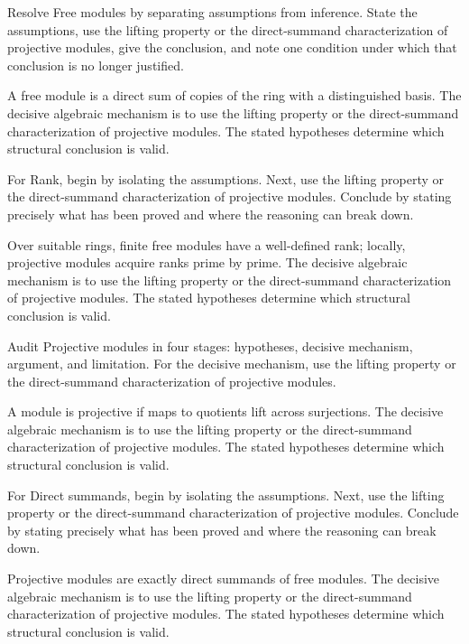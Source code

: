 \begin{problem}\label{prob:v13-problem-01}
Resolve Free modules by separating assumptions from inference. State the assumptions, use the lifting property or the direct-summand characterization of projective modules, give the conclusion, and note one condition under which that conclusion is no longer justified.
\end{problem}
\begin{solution}
A free module is a direct sum of copies of the ring with a distinguished basis. The decisive algebraic mechanism is to use the lifting property or the direct-summand characterization of projective modules. The stated hypotheses determine which structural conclusion is valid.
\end{solution}

\begin{problem}\label{prob:v13-problem-02}
For Rank, begin by isolating the assumptions. Next, use the lifting property or the direct-summand characterization of projective modules. Conclude by stating precisely what has been proved and where the reasoning can break down.
\end{problem}
\begin{solution}
Over suitable rings, finite free modules have a well-defined rank; locally, projective modules acquire ranks prime by prime. The decisive algebraic mechanism is to use the lifting property or the direct-summand characterization of projective modules. The stated hypotheses determine which structural conclusion is valid.
\end{solution}

\begin{problem}\label{prob:v13-problem-03}
Audit Projective modules in four stages: hypotheses, decisive mechanism, argument, and limitation. For the decisive mechanism, use the lifting property or the direct-summand characterization of projective modules.
\end{problem}
\begin{solution}
A module is projective if maps to quotients lift across surjections. The decisive algebraic mechanism is to use the lifting property or the direct-summand characterization of projective modules. The stated hypotheses determine which structural conclusion is valid.
\end{solution}

\begin{problem}\label{prob:v13-problem-04}
For Direct summands, begin by isolating the assumptions. Next, use the lifting property or the direct-summand characterization of projective modules. Conclude by stating precisely what has been proved and where the reasoning can break down.
\end{problem}
\begin{solution}
Projective modules are exactly direct summands of free modules. The decisive algebraic mechanism is to use the lifting property or the direct-summand characterization of projective modules. The stated hypotheses determine which structural conclusion is valid.
\end{solution}

